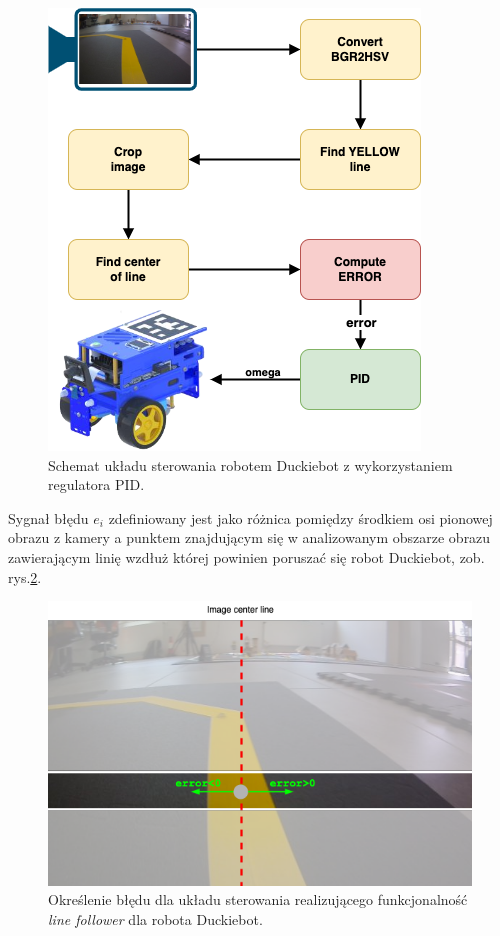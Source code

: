 \documentclass[conference]{IEEEtran}
\begin{document}
\begin{figure}[h]
    \centering
    \includegraphics[width=.8\columnwidth]{PipeLinePID}
    \caption{Schemat układu sterowania robotem Duckiebot z wykorzystaniem regulatora PID.}
    \label{fig:pid-pipeline}
\end{figure}

Sygnał błędu $e_i$ zdefiniowany jest jako różnica pomiędzy środkiem osi pionowej obrazu z kamery a punktem znajdującym się w analizowanym obszarze obrazu zawierającym linię wzdłuż której powinien poruszać się robot Duckiebot, zob. rys.\;\ref{fig:error-definition}. 

\begin{figure}[h]
    \centering
    \includegraphics[width=.95\columnwidth]{ErrorDefinition.png}
    \caption{Określenie błędu dla układu sterowania realizującego funkcjonalność \emph{line follower} dla robota Duckiebot.}
    \label{fig:error-definition}
\end{figure}
\end{document}
